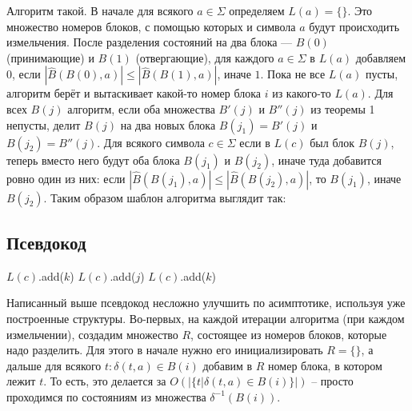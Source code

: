 \documentclass{article}
\begin{document}
Алгоритм такой. В начале для всякого $a \in \Sigma$ определяем $L(a) = \{\}$. Это множество номеров блоков, с помощью которых и символа $a$ будут происходить измельчения. После разделения состояний на два блока --- $B(0)$ (принимающие) и $B(1)$ (отвергающие), для каждого $a \in \Sigma$ в $L(a)$ добавляем $0$, если $|\hat B(B(0), a)| \le |\hat B(B(1), a)|$, иначе $1$. Пока не все $L(a)$ пусты, алгоритм берёт и вытаскивает какой-то номер блока $i$ из какого-то $L(a)$. Для всех $B(j)$ алгоритм, если оба множества $B'(j)$ и $B''(j)$ из теоремы 1 непусты, делит $B(j)$ на два новых блока $B(j_1) = B'(j)$ и $B(j_2) = B''(j)$. Для всякого символа $c \in \Sigma$ если в $L(c)$ был блок $B(j)$, теперь вместо него будут оба блока $B(j_1)$ и $B(j_2)$, иначе туда добавится ровно один из них: если $|\hat B(B(j_1), a)| \le |\hat B(B(j_2), a)|$, то $B(j_1)$, иначе $B(j_2)$. Таким образом шаблон алгоритма выглядит так:
\hypertarget{pseudocode}{\subsection{Псевдокод}}
\begin{algorithm}
  \begin{algorithmic}[1]
  \label{line1}
  \label{line2}
      \label{line5}
      \label{line6}
      \label{line8}

          \label{line10}
          \State $L(c)$.add($k$)
          \label{line11}
          \label{line12}
          \State $L(c)$.add($j$)
          \label{line13}
        \Else
          \State $L(c)$.add($k$)
          \label{line15}
        \EndIf
        \label{line16}
      \EndFor
    \EndIf
  \EndFor
  \EndWhile
  \end{algorithmic}
\end{algorithm}
Написанный выше псевдокод несложно улучшить по асимптотике, используя уже построенные структуры. Во-первых, на каждой итерации алгоритма (при каждом измельчении), создадим множество $R$, состоящее из номеров блоков, которые надо разделить. Для этого в начале нужно его инициализировать $R = \{\}$, а дальше для всякого $t: \delta(t, a) \in B(i)$ добавим в $R$ номер блока, в котором лежит $t$. То есть, это делается за $O(|\{t | \delta(t, a) \in B(i)\}|)$ -- просто проходимся по состояниям из множества $\delta^{-1}(B(i))$.
\end{document}
